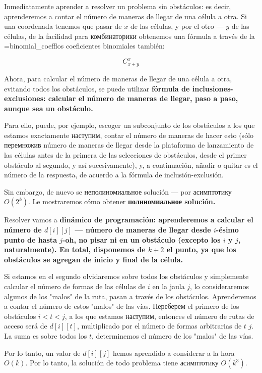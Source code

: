 Inmediatamente aprender a resolver un problema sin obstáculos: es decir, aprenderemos a contar el número de maneras de llegar de una célula a otra. Si una coordenada tenemos que pasar de $x$ de las células, y por el otro --- $y$ de las células, de la facilidad para комбинаторики obtenemos una fórmula a través de la \algohref=binomial_coeff{los coeficientes binomiales también}:

$$ C_{x+y}^{x} $$

Ahora, para calcular el número de maneras de llegar de una célula a otra, evitando todos los obstáculos, se puede utilizar \bf{fórmula de inclusiones-exclusiones}: calcular el número de maneras de llegar, paso a paso, aunque sea un obstáculo.

Para ello, puede, por ejemplo, escoger un subconjunto de los obstáculos a los que estamos exactamente наступим, contar el número de maneras de hacer esto (sólo перемножив número de maneras de llegar desde la plataforma de lanzamiento de las células antes de la primera de las selecciones de obstáculos, desde el primer obstáculo al segundo, y así sucesivamente), y, a continuación, añadir o quitar es el número de la respuesta, de acuerdo a la fórmula de inclusión-exclusión.

Sin embargo, de nuevo se неполиномиальное solución --- por асимптотику $O (2^k)$. Le mostraremos cómo obtener \bf{полиномиальное solución}.

Resolver vamos a \bf{dinámico de programación}: aprenderemos a calcular el número de $d[i][j]$ --- número de maneras de llegar desde $i$-ésimo punto de hasta $j$-oh, no pisar ni en un obstáculo (excepto los $i$ y $j$, naturalmente). En total, disponemos de $k+2$ el punto, ya que los obstáculos se agregan de inicio y final de la célula.

Si estamos en el segundo olvidaremos sobre todos los obstáculos y simplemente calcular el número de formas de las células de $i$ en la jaula $j$, lo consideraremos algunos de los "malos" de la ruta, pasan a través de los obstáculos. Aprenderemos a contar el número de estos "malos" de las vías. Переберем el primero de los obstáculos $i < t < j$, a los que estamos наступим, entonces el número de rutas de acceso será de $d[i][t]$, multiplicado por el número de formas arbitrarias de $t$ $j$. La suma es sobre todos los $t$, determinemos el número de los "malos" de las vías.

Por lo tanto, un valor de $d[i][j]$ hemos aprendido a considerar a la hora $O(k)$. Por lo tanto, la solución de todo problema tiene асимптотику $O(k^3)$.


